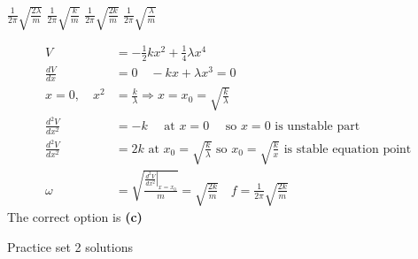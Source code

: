 \begin{enumerate}
\begin{tasks}
		\task[\textbf{A.}] $\frac{1}{2 \pi} \sqrt{\frac{2 \lambda}{m}}$
		\task[\textbf{B.}]$\frac{1}{2 \pi} \sqrt{\frac{k}{m}}$
		\task[\textbf{C.}]$\frac{1}{2 \pi} \sqrt{\frac{2 k}{m}}$
		\task[\textbf{D.}]$\frac{1}{2 \pi} \sqrt{\frac{\lambda}{m}}$
	\end{tasks}
	\begin{answer}
		\begin{align*}
		V&=-\frac{1}{2} k x^{2}+\frac{1}{4} \lambda x^{4}\\
		\frac{d V}{d x}&=0 \quad-k x+\lambda x^{3}=0\\
		x=0, \quad x^{2}&=\frac{k}{\lambda} \Rightarrow x=x_{0}=\sqrt{\frac{k}{\lambda}}\\
		\frac{d^{2} V}{d x^{2}}&=-k \quad \text { at } x=0 \quad \text { so } x=0 \text { is unstable part }\\
		\frac{d^{2} V}{d x^{2}}&=2 k \text { at } x_{0}=\sqrt{\frac{k}{\lambda}} \text { so } x_{0}=\sqrt{\frac{k}{x}} \text { is stable equation point }\\
		\omega&=\sqrt{\frac{\left.\frac{d^{2} V}{d x^{2}}\right|_{x=x_{0}}}{m}}=\sqrt{\frac{2 k}{m}} \quad f=\frac{1}{2 \pi} \sqrt{\frac{2 k}{m}}
		\end{align*}
		The correct option is \textbf{(c)}
	\end{answer}
\end{enumerate}
\newpage
\begin{abox}
Practice set 2 solutions
\end{abox}
